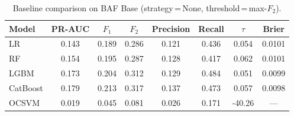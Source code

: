 \begin{table}[ht]
\centering
\caption{Baseline comparison on BAF Base (strategy\,=\,None, threshold\,=\,max-$F_2$).}
\label{tab:baseline_baf}
\begin{tabular}{l c c c c c c c}
\toprule
Model & PR-AUC & $F_1$ & $F_2$ & Precision & Recall & $\tau$ & Brier \\
\midrule
LR         & 0.143 & 0.189 & 0.286 & 0.121 & 0.436 & 0.054 & 0.0101 \\
RF         & 0.154 & 0.195 & 0.287 & 0.128 & 0.417 & 0.062 & 0.0101 \\
LGBM       & 0.173 & 0.204 & 0.312 & 0.129 & 0.484 & 0.051 & 0.0099 \\
CatBoost   & 0.179 & 0.213 & 0.317 & 0.137 & 0.473 & 0.057 & 0.0098 \\
OCSVM      & 0.019 & 0.045 & 0.081 & 0.026 & 0.171 & -40.26 & --- \\
\bottomrule
\end{tabular}
\end{table}